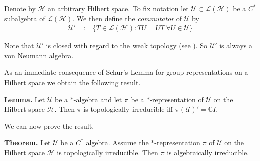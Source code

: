 \documentclass[12pt]{article}
\theoremstyle{definition}
\theoremstyle{plain}
\begin{document}
Denote by $\mathcal{H}$ an arbitrary Hilbert space.
To fix notation let $\mathcal{U} \subset \mathcal{L}(\mathcal{H})$ be a $C^{\ast}$ subalgebra of $\mathcal{L}(\mathcal{H})$. We then define the \emph{commutator} of $\mathcal{U}$ by
\begin{align*}
\mathcal{U}' &:= \{T \in \mathcal{L}(\mathcal{H}) : TU = UT \ \forall U \in \mathcal{U}\}
\end{align*}

Note that $\mathcal{U}'$ is closed with regard to the weak topology (see ). So $\mathcal{U}'$ is always a von Neumann algebra.

As an immediate consequence of Schur's Lemma for group representations on a Hilbert space we obtain the following result.

\textbf{Lemma.}
Let $\mathcal{U}$ be a $\ast$-algebra and let $\pi$ be a $\ast$-representation of $\mathcal{U}$ on the Hilbert space $\mathcal{H}$. Then $\pi$ is topologically irreducible iff $\pi(\mathcal{U})' = \mathbb{C} I$. 


We can now prove the result.

\textbf{Theorem.}
Let $\mathcal{U}$ be a $C^{\ast}$ algebra. Assume the $\ast$-representation $\pi$ of $\mathcal{U}$ on the Hilbert space $\mathcal{H}$ is topologically irreducible. Then $\pi$ is algebraically irreducible.   
\end{document}
